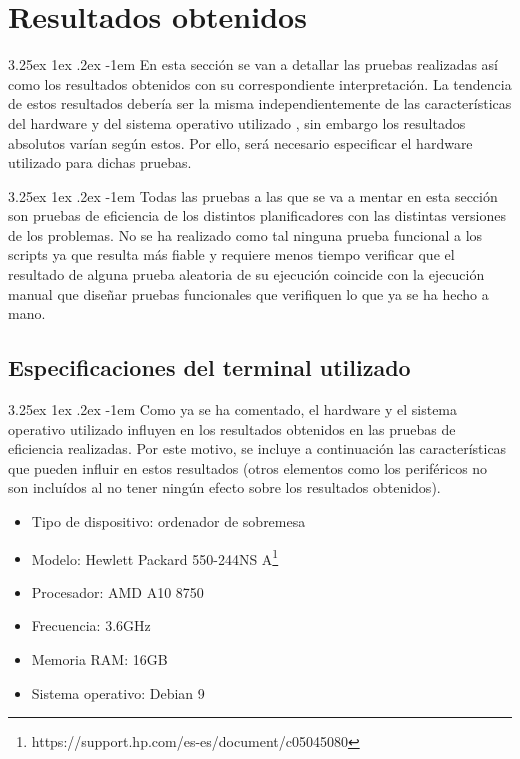 \documentclass{article}
\makeatletter
\renewcommand\paragraph{\@startsection{paragraph}{5}{\z@}%
  {3.25ex \@plus1ex \@minus.2ex}%
  {-1em}%
  {\normalfont\normalsize\bfseries}}
\makeatother
\begin{document}
\section{Resultados obtenidos}
\paragraph{}
En esta sección se van a detallar las pruebas realizadas así como los resultados obtenidos con su correspondiente interpretación. La tendencia de estos resultados debería ser la misma independientemente de las características del hardware y del sistema operativo utilizado , sin embargo los resultados absolutos varían según estos. Por ello, será necesario especificar el hardware utilizado para dichas pruebas.

\paragraph{}
Todas las pruebas a las que se va a mentar en esta sección son pruebas de eficiencia de los distintos planificadores con las distintas versiones de los problemas. No se ha realizado como tal ninguna prueba funcional a los scripts ya que resulta más fiable y requiere menos tiempo verificar que el resultado de alguna prueba aleatoria de su ejecución coincide con la ejecución manual que diseñar pruebas funcionales que verifiquen lo que ya se ha hecho a mano.

\subsection{Especificaciones del terminal utilizado}
\paragraph{}
Como ya se ha comentado, el hardware y el sistema operativo utilizado influyen en los resultados obtenidos en las pruebas de eficiencia realizadas. Por este motivo, se incluye a continuación las características que pueden influir en estos resultados (otros elementos como los periféricos no son incluídos al no tener ningún efecto sobre los resultados obtenidos).

\begin{itemize}
    \item Tipo de dispositivo: ordenador de sobremesa
    \item Modelo: Hewlett Packard 550-244NS A\footnote{https://support.hp.com/es-es/document/c05045080}
    \item Procesador: AMD A10 8750 
    \item Frecuencia: 3.6GHz
    \item Memoria RAM: 16GB
    \item Sistema operativo: Debian 9
\end{itemize}
\end{document}
